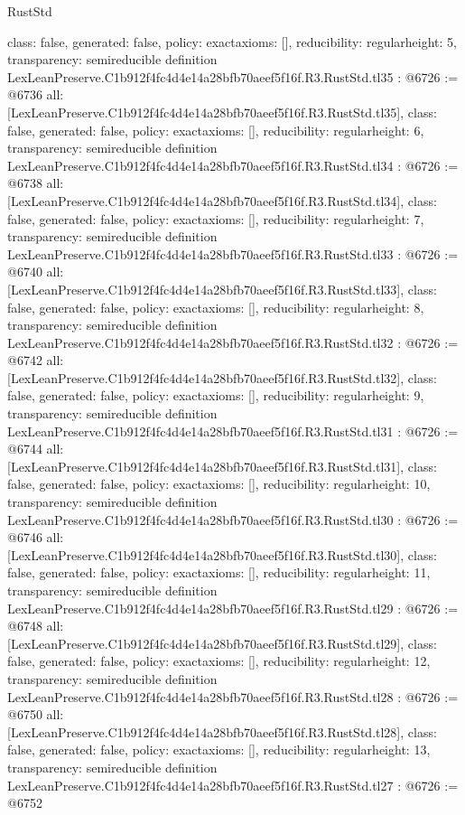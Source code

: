 \begin{lexlean}{RustStd}
\begin{coremodule}
{  class: false,
  generated: false,
  policy: exact{axioms: []},
  reducibility: regular{height: 5},
  transparency: semireducible
}
definition LexLeanPreserve.C1b912f4fc4d4e14a28bfb70aeef5f16f.R3.RustStd.tl35 : @6726 := @6736 {
  all: [LexLeanPreserve.C1b912f4fc4d4e14a28bfb70aeef5f16f.R3.RustStd.tl35],
  class: false,
  generated: false,
  policy: exact{axioms: []},
  reducibility: regular{height: 6},
  transparency: semireducible
}
definition LexLeanPreserve.C1b912f4fc4d4e14a28bfb70aeef5f16f.R3.RustStd.tl34 : @6726 := @6738 {
  all: [LexLeanPreserve.C1b912f4fc4d4e14a28bfb70aeef5f16f.R3.RustStd.tl34],
  class: false,
  generated: false,
  policy: exact{axioms: []},
  reducibility: regular{height: 7},
  transparency: semireducible
}
definition LexLeanPreserve.C1b912f4fc4d4e14a28bfb70aeef5f16f.R3.RustStd.tl33 : @6726 := @6740 {
  all: [LexLeanPreserve.C1b912f4fc4d4e14a28bfb70aeef5f16f.R3.RustStd.tl33],
  class: false,
  generated: false,
  policy: exact{axioms: []},
  reducibility: regular{height: 8},
  transparency: semireducible
}
definition LexLeanPreserve.C1b912f4fc4d4e14a28bfb70aeef5f16f.R3.RustStd.tl32 : @6726 := @6742 {
  all: [LexLeanPreserve.C1b912f4fc4d4e14a28bfb70aeef5f16f.R3.RustStd.tl32],
  class: false,
  generated: false,
  policy: exact{axioms: []},
  reducibility: regular{height: 9},
  transparency: semireducible
}
definition LexLeanPreserve.C1b912f4fc4d4e14a28bfb70aeef5f16f.R3.RustStd.tl31 : @6726 := @6744 {
  all: [LexLeanPreserve.C1b912f4fc4d4e14a28bfb70aeef5f16f.R3.RustStd.tl31],
  class: false,
  generated: false,
  policy: exact{axioms: []},
  reducibility: regular{height: 10},
  transparency: semireducible
}
definition LexLeanPreserve.C1b912f4fc4d4e14a28bfb70aeef5f16f.R3.RustStd.tl30 : @6726 := @6746 {
  all: [LexLeanPreserve.C1b912f4fc4d4e14a28bfb70aeef5f16f.R3.RustStd.tl30],
  class: false,
  generated: false,
  policy: exact{axioms: []},
  reducibility: regular{height: 11},
  transparency: semireducible
}
definition LexLeanPreserve.C1b912f4fc4d4e14a28bfb70aeef5f16f.R3.RustStd.tl29 : @6726 := @6748 {
  all: [LexLeanPreserve.C1b912f4fc4d4e14a28bfb70aeef5f16f.R3.RustStd.tl29],
  class: false,
  generated: false,
  policy: exact{axioms: []},
  reducibility: regular{height: 12},
  transparency: semireducible
}
definition LexLeanPreserve.C1b912f4fc4d4e14a28bfb70aeef5f16f.R3.RustStd.tl28 : @6726 := @6750 {
  all: [LexLeanPreserve.C1b912f4fc4d4e14a28bfb70aeef5f16f.R3.RustStd.tl28],
  class: false,
  generated: false,
  policy: exact{axioms: []},
  reducibility: regular{height: 13},
  transparency: semireducible
}
definition LexLeanPreserve.C1b912f4fc4d4e14a28bfb70aeef5f16f.R3.RustStd.tl27 : @6726 := @6752 {
}
\end{coremodule}
\end{lexlean}
